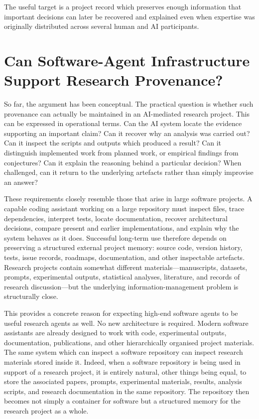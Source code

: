 \documentclass[12pt]{article}
\begin{document}
The useful target is a project record which preserves enough information that important decisions can later be recovered and explained even when expertise was originally distributed across several human and AI participants.


\section{Can Software-Agent Infrastructure Support Research Provenance?}

So far, the argument has been conceptual. The practical question is whether such provenance can actually be maintained in an AI-mediated research project.
This can be expressed in operational terms.
Can the AI system locate the evidence supporting an important claim? Can it recover why an analysis was carried out? Can it inspect the scripts and outputs which produced a result? Can it distinguish implemented work from planned work, or empirical findings from conjectures? Can it explain the reasoning behind a particular decision? When challenged, can it return to the underlying artefacts rather than simply improvise an answer?

These requirements closely resemble those that arise in large software projects.
A capable coding assistant working on a large repository must inspect files, trace dependencies, interpret tests, locate documentation, recover architectural decisions, compare present and earlier implementations, and explain why the system behaves as it does. Successful long-term use therefore depends on preserving a structured external project memory: source code, version history, tests, issue records, roadmaps, documentation, and other inspectable artefacts.
Research projects contain somewhat different materials---manuscripts, datasets, prompts, experimental outputs, statistical analyses, literature, and records of research discussion---but the underlying information-management problem is structurally close.

This provides a concrete reason for expecting high-end software agents to be useful research agents as well. No new architecture is required. Modern software assistants are already designed to work with code, experimental outputs, documentation, publications, and other hierarchically organised project materials. The same system which can inspect a software repository can inspect research materials stored inside it.
Indeed, when a software repository is being used in support of a research project, it is entirely natural, other things being equal, to store the associated papers, prompts, experimental materials, results, analysis scripts, and research documentation in the same repository. The repository then becomes not simply a container for software but a structured memory for the research project as a whole.
\end{document}
